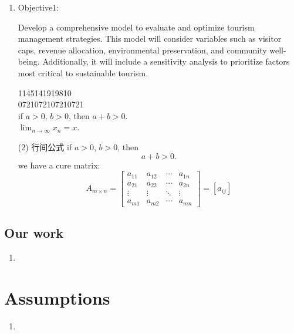 \documentclass[UTF8]{mcmthesis}
\begin{document}
            \begin{enumerate}
                \item  Objective1: 
                
                Develop a comprehensive model to evaluate and optimize tourism management strategies. This model will consider variables such as visitor caps, revenue allocation, environmental preservation, and community well-being. Additionally, it will include a sensitivity analysis to prioritize factors most critical to sustainable tourism.

                1145141919810\\
                0721072107210721\\
                if $a>0$, $b>0$, then $a+b>0$.\\
                $\displaystyle\lim_{n\to\infty}x_n=x$.\\

                \item[(2)] 行间公式
                if $a>0$, $b>0$, then 
                    \[
                    a+b>0.
                    \]
                we have a cure matrix:
                    \[
                        A_{m\times n}=  
                        \begin{bmatrix}  
                          a_{11}& a_{12}& \cdots  & a_{1n} \\  
                          a_{21}& a_{22}& \cdots  & a_{2n} \\  
                          \vdots & \vdots & \ddots & \vdots \\  
                          a_{m1}& a_{m2}& \cdots  & a_{mn}  
                        \end{bmatrix}  
                        =\left [ a_{ij}\right ] 
                    \]
            \end{enumerate}
        \subsection{Our work}
            \begin{enumerate}
                \item 
            \end{enumerate}
            

    \section{Assumptions}
        \begin{enumerate}
            \item 
        \end{enumerate}
        
\end{document}
